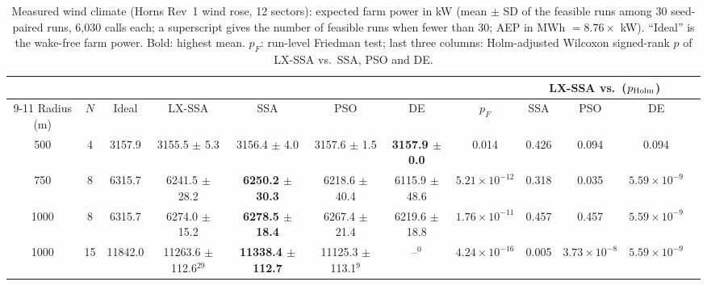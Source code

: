 \begin{table}[!t]
\centering
\caption{Measured wind climate (Horns Rev~1 wind rose, 12 sectors): expected farm power in kW (mean $\pm$ SD of the feasible runs among 30 seed-paired runs, 6,030 calls each; a superscript gives the number of feasible runs when fewer than 30; AEP in MWh $=8.76\times$ kW). ``Ideal'' is the wake-free farm power. Bold: highest mean. $p_F$: run-level Friedman test; last three columns: Holm-adjusted Wilcoxon signed-rank $p$ of LX-SSA vs.\ SSA, PSO and DE.}
\label{tab:hornsrev}
\footnotesize\setlength{\tabcolsep}{3pt}
\begin{tabular}{cccccccccccc}
\toprule
& & & & & & & & \multicolumn{3}{c}{LX-SSA vs.\ ($p_{\rm Holm}$)} \\
\cmidrule(lr){9-11}
Radius (m) & $N$ & Ideal & LX-SSA & SSA & PSO & DE & $p_F$ & SSA & PSO & DE \\
\midrule
500 & 4 & 3157.9 & 3155.5 $\pm$ 5.3 & 3156.4 $\pm$ 4.0 & 3157.6 $\pm$ 1.5 & \textbf{3157.9 $\pm$ 0.0} & 0.014 & 0.426 & 0.094 & 0.094 \\
750 & 8 & 6315.7 & 6241.5 $\pm$ 28.2 & \textbf{6250.2 $\pm$ 30.3} & 6218.6 $\pm$ 40.4 & 6115.9 $\pm$ 48.6 & $5.21\times10^{-12}$ & 0.318 & 0.035 & $5.59\times10^{-9}$ \\
1000 & 8 & 6315.7 & 6274.0 $\pm$ 15.2 & \textbf{6278.5 $\pm$ 18.4} & 6267.4 $\pm$ 21.4 & 6219.6 $\pm$ 18.8 & $1.76\times10^{-11}$ & 0.457 & 0.457 & $5.59\times10^{-9}$ \\
1000 & 15 & 11842.0 & 11263.6 $\pm$ 112.6$^{29}$ & \textbf{11338.4 $\pm$ 112.7} & 11125.3 $\pm$ 113.1$^{9}$ & --$^{0}$ & $4.24\times10^{-16}$ & 0.005 & $3.73\times10^{-8}$ & $5.59\times10^{-9}$ \\
\bottomrule
\end{tabular}
\end{table}
